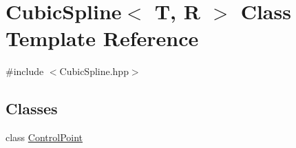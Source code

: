\hypertarget{class_cubic_spline}{\section{Cubic\+Spline$<$ T, R $>$ Class Template Reference}
\label{class_cubic_spline}
}


{\ttfamily \#include $<$Cubic\+Spline.\+hpp$>$}

\subsection*{Classes}
\begin{DoxyCompactItemize}
\item 
class \hyperlink{class_cubic_spline_1_1_control_point}{Control\+Point}
\end{DoxyCompactItemize}
